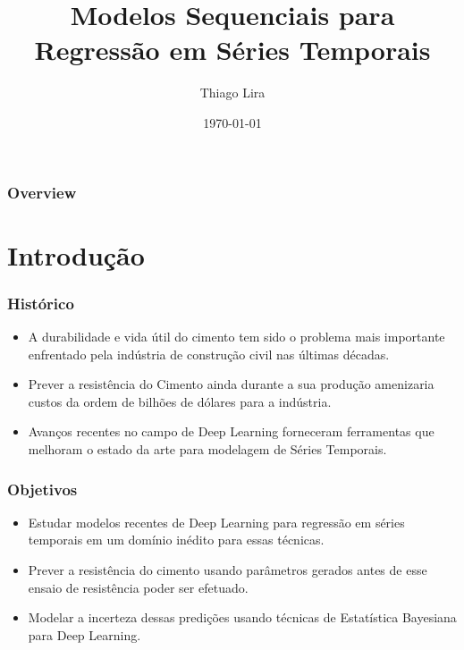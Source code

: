 \documentclass{beamer}
\title{Modelos Sequenciais para Regressão em Séries Temporais} %
\author{Thiago Lira} %
\institute[IME-USP] %
{
Instituto de Matemática e Estatística - USP \\ %
\medskip
\textit{thlira@ime.usp.br} %
}
\date{\today} %
\begin{document}
\begin{frame}
\titlepage %
\end{frame}

\begin{frame}
\frametitle{Overview} %
\tableofcontents %
\end{frame}


\section{Introdução}


\begin{frame}
\frametitle{Histórico}

\begin{itemize}
\item A durabilidade e vida útil do cimento tem sido o problema mais importante enfrentado
pela indústria de construção civil nas últimas décadas.
\item Prever a resistência do Cimento ainda durante a sua produção amenizaria
  custos da ordem de bilhões de dólares para a indústria.
\item Avanços recentes no campo de Deep Learning forneceram ferramentas que
  melhoram o estado da arte para modelagem de Séries Temporais.
\end{itemize}

\end{frame}


\begin{frame}
\frametitle{Objetivos}

\begin{itemize}
\item Estudar modelos recentes de Deep Learning para regressão em séries
  temporais em um domínio inédito para essas técnicas. 
\item Prever a resistência do cimento usando parâmetros gerados antes de esse
  ensaio de resistência poder ser efetuado.
  \item Modelar a incerteza dessas predições usando técnicas de Estatística
    Bayesiana para Deep Learning.
\end{itemize}

\end{frame}
\end{document}
